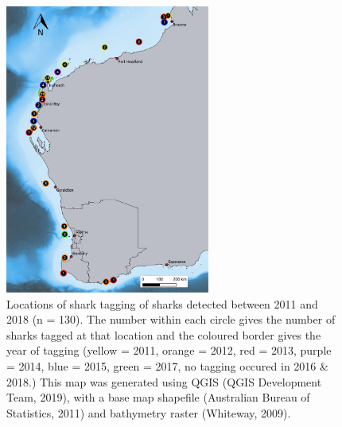 \documentclass[11pt,a4paper]{article}
\begin{document}
	
	\begin{figure}
		\centering\includegraphics[width=0.6\textwidth]{../Data/Release_map.pdf}
		\caption{Locations of shark tagging of sharks detected between 2011 and 2018 (n = 130). The number within each circle gives the number of sharks tagged at that location and the coloured border gives the year of tagging (yellow = 2011, orange = 2012, red = 2013, purple = 2014, blue = 2015, green = 2017, no tagging occured in 2016 \& 2018.) This map was generated using QGIS (QGIS Development Team, 2019), with a base map shapefile (Australian Bureau of Statistics, 2011) and bathymetry raster (Whiteway, 2009).}
		\label{releases}
	\end{figure}
	
\end{document}
